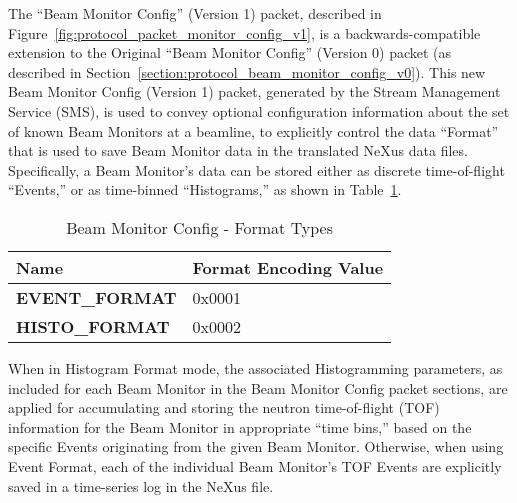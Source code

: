 The ``Beam Monitor Config'' (Version 1) packet, described in
Figure~\ref{fig:protocol_packet_monitor_config_v1},
is a backwards-compatible extension to the Original
``Beam Monitor Config'' (Version 0) packet
(as described in Section~\ref{section:protocol_beam_monitor_config_v0}).
This new Beam Monitor Config (Version 1) packet,
generated by the Stream Management Service (SMS),
is used to convey optional configuration information
about the set of known Beam Monitors at a beamline,
to explicitly control the data ``Format'' that is used
to save Beam Monitor data in the translated NeXus data files.
Specifically, a Beam Monitor's data can be stored either as discrete
time-of-flight ``Events,'' or as time-binned ``Histograms,''
as shown in Table~\ref{table:monitor_config_format}.

\begin{table}[h]
  \begin{center}
    \begin{tabular}{l | l}
	Name & Format Encoding Value \\
	\hline
	{\bf EVENT\_FORMAT} & 0x0001 \\
	{\bf HISTO\_FORMAT} & 0x0002 \\
    \end{tabular}
  \end{center}
  \caption {Beam Monitor Config - Format Types}
  \label{table:monitor_config_format}
\end{table}

When in Histogram Format mode,
the associated Histogramming parameters,
as included for each Beam Monitor
in the Beam Monitor Config packet sections,
are applied for accumulating and storing the neutron time-of-flight (TOF)
information for the Beam Monitor in appropriate ``time bins,''
based on the specific Events originating from the given Beam Monitor.
Otherwise, when using Event Format,
each of the individual Beam Monitor's TOF Events are explicitly saved
in a time-series log in the NeXus file.

